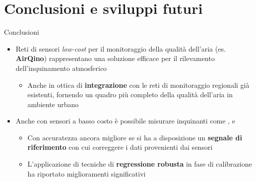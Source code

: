 \section{Conclusioni e sviluppi futuri}
\begin{frame}{Conclusioni}
\begin{itemize}
  \item Reti di sensori \textit{low-cost} per il monitoraggio della qualità dell'aria (es. \textbf{AirQino}) rappresentano una soluzione efficace per il rilevamento dell'inquinamento atmosferico\vspace{0.2cm}
  \begin{itemize}
    \item Anche in ottica di \textbf{integrazione} con le reti di monitoraggio regionali già esistenti, fornendo un quadro più completo della qualità dell'aria in ambiente urbano
  \end{itemize}\vspace{0.2cm}
  \item Anche con sensori a basso costo è possibile misurare inquinanti come ,  e \vspace{0.2cm}
  \begin{itemize}
    \item Con accuratezza ancora migliore se si ha a disposizione un \textbf{segnale di riferimento} con cui correggere i dati provenienti dai sensori\vspace{0.1cm}
    \item L'applicazione di tecniche di \textbf{regressione robusta} in fase di calibrazione ha riportato miglioramenti significativi
  \end{itemize}
\end{itemize}
\end{frame}

